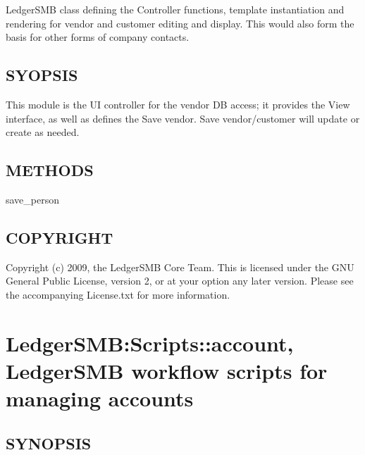 LedgerSMB class defining the Controller
functions, template instantiation and rendering for vendor and customer editing 
and display.  This would also form the basis for other forms of company
contacts.

\subsection*{SYOPSIS\label{LedgerSMB::ScriptLib::Company_SYOPSIS}}


This module is the UI controller for the vendor DB access; it provides the 
View interface, as well as defines the Save vendor. 
Save vendor/customer will update or create as needed.

\subsection*{METHODS\label{LedgerSMB::ScriptLib::Company_METHODS}}
\begin{description}

\item[{save\_person}] \mbox{}\end{description}
\subsection*{COPYRIGHT\label{LedgerSMB::ScriptLib::Company_COPYRIGHT}}


Copyright (c) 2009, the LedgerSMB Core Team.  This is licensed under the GNU 
General Public License, version 2, or at your option any later version.  Please 
see the accompanying License.txt for more information.

\section{LedgerSMB:Scripts::account, LedgerSMB workflow scripts for managing accounts\label{LedgerSMB:Scripts::account_LedgerSMB_workflow_scripts_for_managing_accounts}}




\subsection*{SYNOPSIS\label{LedgerSMB:Scripts::account_LedgerSMB_workflow_scripts_for_managing_accounts_SYNOPSIS}}


